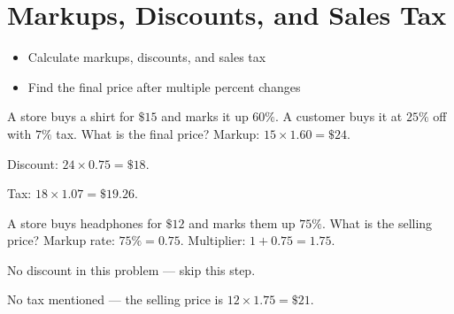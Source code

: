 \section{Markups, Discounts, and Sales Tax}

\begin{stepGoal}
\begin{itemize}
    \item Calculate markups, discounts, and sales tax
    \item Find the final price after multiple percent changes
\end{itemize}
\end{stepGoal}

\begin{stepVocabBox}
\end{stepVocabBox}

\begin{stepsCard}
\end{stepsCard}

\begin{stepExample}{A store buys a shirt for $\$15$ and marks it up $60\%$. A customer buys it at $25\%$ off with $7\%$ tax. What is the final price?}
     Markup: $15 \times 1.60 = \$24$.

     Discount: $24 \times 0.75 = \$18$.

     Tax: $18 \times 1.07 = \$19.26$.
\end{stepExample}

\begin{stepExample}{A store buys headphones for $\$12$ and marks them up $75\%$. What is the selling price?}
     Markup rate: $75\% = 0.75$. Multiplier: $1 + 0.75 = 1.75$.

     No discount in this problem — skip this step.

     No tax mentioned — the selling price is $12 \times 1.75 = \$21$.
\end{stepExample}

